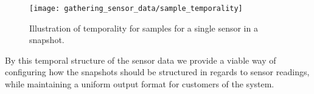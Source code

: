 \begin{figure}[!htbp]
    \centering
    \texttt{[image: gathering\_sensor\_data/sample\_temporality]}
    \caption{Illustration of temporality for samples for a single sensor in a snapshot.}
    \label{fig:sample_temporality}
\end{figure}
\FloatBarrier

By this temporal structure of the sensor data we provide a viable way of configuring how the snapshots should be structured in regards to sensor readings, while maintaining a uniform output format for customers of the system.
